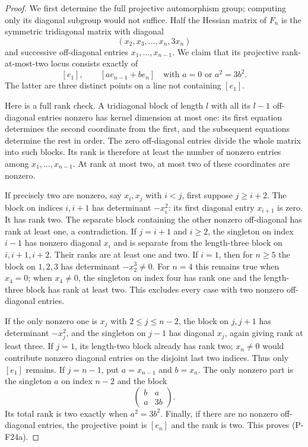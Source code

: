 \documentclass[11pt,a4paper]{article}
\begin{document}
\begin{proof}
We first determine the full projective automorphism group; computing
only its diagonal subgroup would not suffice. Half the Hessian matrix
of $F_n$ is the symmetric tridiagonal matrix with diagonal
\[
 (x_2,x_3,\ldots,x_n,3x_n)
\]
and successive off-diagonal entries $x_1,\ldots,x_{n-1}$.
We claim that its projective rank-at-most-two locus consists exactly of
\[
 [e_1],\qquad
 [a e_{n-1}+b e_n]\quad
 \text{with }a=0\text{ or }a^2=3b^2.
 \tag{P-F24a}
\]
The latter are three distinct points on a line not containing $[e_1]$.

Here is a full rank check. A tridiagonal block of length $l$ with
all its $l-1$ off-diagonal entries nonzero has kernel dimension at
most one: its first equation determines the second coordinate from
the first, and the subsequent equations determine the rest in order.
The zero off-diagonal entries divide the whole matrix into such
blocks. Its rank is therefore at least the number of nonzero
entries among $x_1,\ldots,x_{n-1}$. At rank at most two, at most
two of these coordinates are nonzero.

If precisely two are nonzero, say $x_i,x_j$ with $i<j$, first
suppose $j\ge i+2$. The block on indices $i,i+1$ has determinant
$-x_i^2$: its first diagonal entry $x_{i+1}$ is zero. It has
rank two. The separate block containing the other nonzero
off-diagonal has rank at least one, a contradiction. If
$j=i+1$ and $i\ge2$, the singleton on index $i-1$ has nonzero
diagonal $x_i$ and is separate from the length-three block on
$i,i+1,i+2$. Their ranks are at least one and two. If $i=1$,
then for $n\ge5$ the block on $1,2,3$ has determinant
$-x_2^3\ne0$. For $n=4$ this remains true when $x_4=0$;
when $x_4\ne0$, the singleton on index four has rank one and
the length-three block has rank at least two. This excludes
every case with two nonzero off-diagonal entries.

If the only nonzero one is $x_j$ with $2\le j\le n-2$,
the block on $j,j+1$ has determinant $-x_j^2$, and the
singleton on $j-1$ has diagonal $x_j$, again giving rank
at least three. If $j=1$, its length-two block already has
rank two; $x_n\ne0$ would contribute nonzero diagonal entries
on the disjoint last two indices. Thus only $[e_1]$ remains.
If $j=n-1$, put $a=x_{n-1}$ and $b=x_n$. The only nonzero
part is the singleton $a$ on index $n-2$ and the block
\[
 \begin{pmatrix}b&a\\a&3b\end{pmatrix}.
\]
Its total rank is two exactly when $a^2=3b^2$.
Finally, if there are no nonzero off-diagonal entries, the
projective point is $[e_n]$ and the rank is two. This proves
(P-F24a).


\end{proof}
\end{document}

